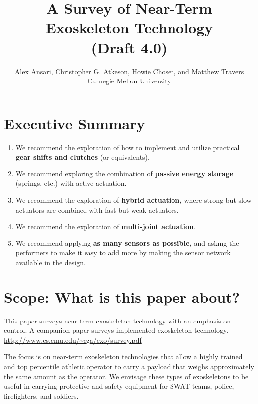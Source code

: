 \documentclass[letterpaper,12pt,fullpage]{article}
\begin{document}
\title{A Survey of Near-Term Exoskeleton Technology\\
(Draft 4.0)}

\author{Alex Ansari, Christopher G. Atkeson, Howie Choset, and Matthew Travers\\
Carnegie Mellon University}

\maketitle

\section{Executive Summary}

\begin{enumerate}
\item
We recommend the exploration of how to implement and utilize practical
{\bf gear shifts and clutches} (or equivalents).
\item
We recommend exploring the combination of {\bf passive energy storage}
(springs, etc.) with active actuation.
\item
We recommend the exploration of {\bf hybrid actuation,} where strong but 
slow actuators are combined with fast but weak actuators.
\item
We recommend the exploration of {\bf multi-joint actuation}.
\item
We recommend applying {\bf as many sensors as possible,} and asking the performers
to make it easy to add more by making the sensor network available in the design.
\end{enumerate}

\section{Scope: What is this paper about?}

This paper surveys near-term exoskeleton technology with an
emphasis on control.
A companion paper surveys implemented exoskeleton technology.\\
\url{http://www.cs.cmu.edu/~cga/exo/survey.pdf}

The focus is on near-term exoskeleton technologies that allow a
highly trained and top percentile athletic 
operator to carry a payload that weighs approximately the same amount
as the operator. We envisage these types of exoskeletons to be useful
in carrying protective and safety equipment for SWAT teams, police,
firefighters, and soldiers. 
\end{document}
